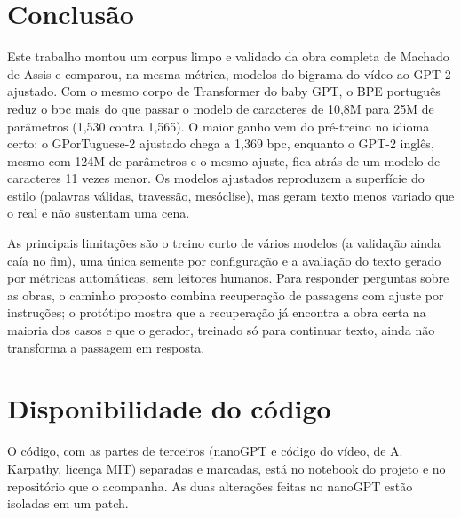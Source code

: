 \documentclass[conference]{IEEEtran}
\begin{document}
\section{Conclusão}

Este trabalho montou um corpus limpo e validado da obra completa de Machado de Assis e comparou, na mesma métrica, modelos do bigrama do vídeo ao GPT-2 ajustado. Com o mesmo corpo de Transformer do baby GPT, o BPE português reduz o bpc mais do que passar o modelo de caracteres de 10,8M para 25M de parâmetros (1,530 contra 1,565). O maior ganho vem do pré-treino no idioma certo: o GPorTuguese-2 ajustado chega a 1,369 bpc, enquanto o GPT-2 inglês, mesmo com 124M de parâmetros e o mesmo ajuste, fica atrás de um modelo de caracteres 11 vezes menor. Os modelos ajustados reproduzem a superfície do estilo (palavras válidas, travessão, mesóclise), mas geram texto menos variado que o real e não sustentam uma cena.

As principais limitações são o treino curto de vários modelos (a validação ainda caía no fim), uma única semente por configuração e a avaliação do texto gerado por métricas automáticas, sem leitores humanos. Para responder perguntas sobre as obras, o caminho proposto combina recuperação de passagens com ajuste por instruções; o protótipo mostra que a recuperação já encontra a obra certa na maioria dos casos e que o gerador, treinado só para continuar texto, ainda não transforma a passagem em resposta.

\section*{Disponibilidade do código}

O código, com as partes de terceiros (nanoGPT e código do vídeo, de A. Karpathy, licença MIT) separadas e marcadas, está no notebook do projeto e no repositório que o acompanha. As duas alterações feitas no nanoGPT estão isoladas em um patch.



\end{document}
